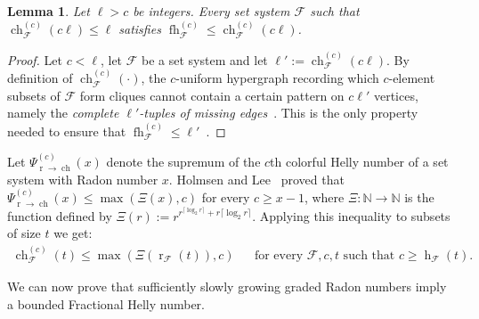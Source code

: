 \documentclass[a4paper,UKenglish,thm-restate]{article}
\newcommand{\N}{\mathbb{N}}
\newcommand{\F}{\mathcal{F}}
\DeclareMathOperator{\h}{h}
\DeclareMathOperator{\rad}{r}
\DeclareMathOperator{\ch}{ch}
\DeclareMathOperator{\fh}{fh}
\newcommand{\pth}[1]{\left(#1\right)}
\newtheorem{lemma}{Lemma}[section]
\begin{document}
\begin{lemma}\label{l:holmsen-graded}
Let $\ell > c$ be integers. Every set system $\F$ such that $\ch^{(c)}_\F(c\ell) \leq \ell$ satisfies $\fh^{(c)}_\F \leq \ch^{(c)}_\F(c\ell)$.
\end{lemma}
\begin{proof}
  Let $c< \ell$, let $\F$ be a set system and let $\ell':=\ch^{(c)}_\F(c\ell)$. By definition of $\ch^{(c)}_\F(\cdot)$, the $c$-uniform hypergraph recording which $c$-element subsets of $\F$ form cliques cannot contain a certain pattern on $c\ell'$ vertices, namely the \emph{complete $\ell'$-tuples of missing edges}~\cite[$\mathsection 3$]{Holmsen2021}. This is the only property needed to ensure that $\fh^{(c)}_\F \leq \ell'$~\cite[Theorem~1.2]{Holmsen2020}.
\end{proof}

\medskip

  Let $\Psi_{\rad \to \ch}^{(c)}(x)$ denote the supremum of the $c$th colorful Helly number of a set system with Radon number $x$. Holmsen and Lee~\cite[Theorem~2.2]{Holmsen2021} proved that $\Psi_{\rad \to \ch}^{(c)}(x) \le \max\pth{\Xi(x),c}$ for every $c \ge x-1$, where  $\Xi: \N \to \N$ is the function defined by $\Xi(r) := r^{r^{\lceil \log_2r \rceil}+r\lceil \log_2r \rceil}$. Applying this inequality to subsets of size $t$ we get:
%
\begin{align}\label{eq:colorful-helly-g}
  \ch^{(c)}_\F(t) \leq \max\pth{\Xi\pth{\rad_\F(t)},c} && \text{for every } \F, c, t \text{ such that } c \ge \h_\F(t).
\end{align}

\medskip

We can now prove that sufficiently slowly growing graded Radon numbers imply a bounded Fractional Helly number.
\end{document}
